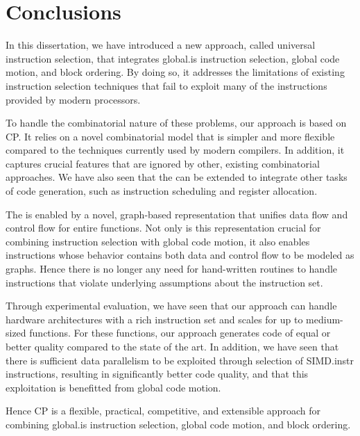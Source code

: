 %

\chapter{Conclusions}

In this dissertation, we have introduced a new approach, called \gls{universal
  instruction selection}, that integrates \gls{global.is} \gls{instruction
  selection}, \gls{global code motion}, and \gls{block ordering}.
%
By doing so, it addresses the limitations of existing \gls{instruction
  selection} techniques that fail to exploit many of the \glspl{instruction}
provided by modern processors.

To handle the combinatorial nature of these problems, our approach is based on
\glsdesc{CP}.
%
It relies on a novel combinatorial model that is simpler and more flexible
compared to the techniques currently used by modern \glspl{compiler}.
%
In addition, it captures crucial features that are ignored by other, existing
combinatorial approaches.
%
We have also seen that the  can be extended to
integrate other tasks of \gls{code generation}, such as \gls{instruction
  scheduling} and \gls{register allocation}.

The  is enabled by a novel, \gls{graph}-based
representation that unifies data flow and control flow for entire
\glspl{function}.
%
Not only is this representation crucial for combining \gls{instruction
  selection} with \gls{global code motion}, it also enables \glspl{instruction}
whose behavior contains both data and control flow to be modeled as
\glspl{graph}.
%
Hence there is no longer any need for hand-written routines to handle
\glspl{instruction} that violate underlying assumptions about the
\gls{instruction set}.

Through experimental evaluation, we have seen that our approach can handle
hardware architectures with a rich \gls{instruction set} and scales for up to
medium-sized \glspl{function}.
%
For these \glspl{function}, our approach generates code of equal or better
quality compared to the state of the art.
%
In addition, we have seen that there is sufficient data parallelism to be
exploited through selection of \gls{SIMD.instr} \glspl{instruction}, resulting
in significantly better code quality, and that this exploitation is benefitted
from \gls{global code motion}.

Hence \glsdesc{CP} is a flexible, practical, competitive, and extensible
approach for combining \gls{global.is} \gls{instruction selection}, \gls{global
  code motion}, and \gls{block ordering}.
